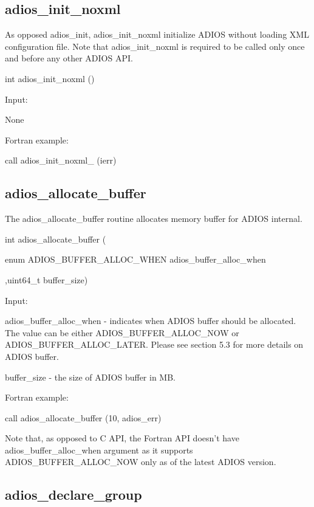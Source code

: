 \subsection{adios\_init\_noxml}

As opposed adios\_init, adios\_init\_noxml initialize ADIOS without loading XML 
configuration file. Note that adios\_init\_noxml is required to be called only 
once and before any other ADIOS API. 

\leftskip=22pt
int adios\_init\_noxml ()

\leftskip=22pt
Input: 

\leftskip=45pt
None

\leftskip=22pt
Fortran example: 

\parindent=13pt
call adios\_init\_noxml\_ (ierr)\label{HToc182553357}

\subsection{adios\_allocate\_buffer}

\leftskip=0pt
\parindent=0pt
The adios\_allocate\_buffer routine allocates memory buffer for ADIOS internal. 

\parindent=18pt
int adios\_allocate\_buffer (

\parindent=54pt
enum ADIOS\_BUFFER\_ALLOC\_WHEN adios\_buffer\_alloc\_when

\leftskip=22pt
\parindent=68pt
,uint64\_t buffer\_size)

\leftskip=22pt
\parindent=0pt
Input: 

\leftskip=40pt
adios\_buffer\_alloc\_when - indicates when ADIOS buffer should be allocated. The 
value can be either {\small ADIOS\_BUFFER\_ALLOC\_NOW                          
   or ADIOS\_BUFFER\_ALLOC\_LATER.  }Please see section 5.3 for more details on 
ADIOS buffer.

\leftskip=36pt
\parindent=4pt
buffer\_size - the size of ADIOS buffer in MB. 

\leftskip=22pt
\parindent=0pt
Fortran example: 

\leftskip=40pt
call adios\_allocate\_buffer (10, adios\_err)

Note that, as opposed to C API, the Fortran API doesn't have adios\_buffer\_alloc\_when 
argument as it supports {\small ADIOS\_BUFFER\_ALLOC\_NOW }only as of the latest 
ADIOS version.\label{HToc182553358}

\subsection{adios\_declare\_group}

